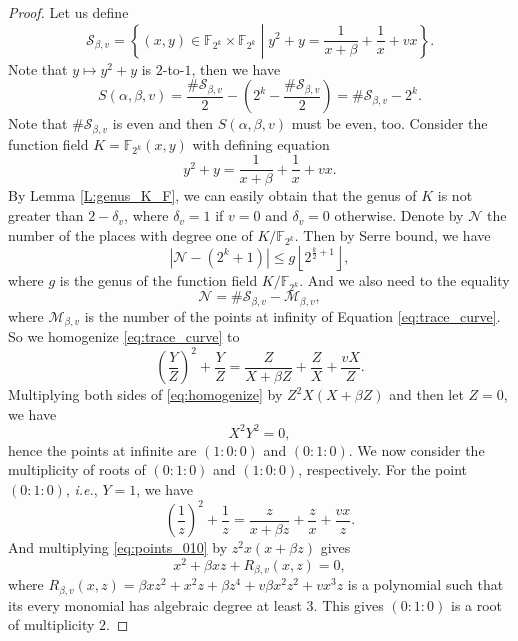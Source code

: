 \documentclass{article}
\newcommand{\F}{\mathbb{F}}
\newcommand{\0}{\textbf{0}}
\newcommand{\1}{\textbf{1}}
\theoremstyle{plain}
\begin{document}
\begin{proof}
        Let us define
        \[\mathcal{S}_{\beta,v}=\left\{(x,y)\in\F_{2^k}\times\F_{2^k}\middle|y^2+y=\frac{1}{x+\beta}+\frac{1}{x}+vx\right\}.\]
        Note that $y\mapsto y^2+y$ is $2$-to-$1$, then we have
        \begin{equation}\label{eq:tracesum_S}
            S(\alpha,\beta,v)=\frac{\#\mathcal{S}_{\beta,v}}{2}-\left(2^k-\frac{\#\mathcal{S}_{\beta,v}}{2}\right)=\#\mathcal{S}_{\beta,v}-2^k.
        \end{equation}
        Note that $\#\mathcal{S}_{\beta,v}$ is even and then $S(\alpha,\beta,v)$ must be even, too.
        Consider the function field $K=\F_{2^k}(x,y)$ with defining equation
        \begin{equation}\label{eq:trace_curve}
            y^2+y=\frac{1}{x+\beta}+\frac{1}{x}+vx.
        \end{equation}
        By Lemma \ref{L:genus_K_F}, we can easily obtain that the genus of $K$ is not greater than $2-\delta_v$,
        where $\delta_v=1$ if $v=0$ and $\delta_v=0$ otherwise.
        Denote by $\mathcal{N}$ the number of the places with degree one of $K/\F_{2^k}$.
        Then by Serre bound\cite{Serre1982serrebound}, we have
        \begin{equation}\label{eq:N_genus_inequality}
            \left\lvert \mathcal{N}-(2^k+1)\right\rvert\le g\left\lfloor 2^{\frac{k}{2}+1}\right\rfloor,
        \end{equation}
        where $g$ is the genus of the function field $K/\F_{2^k}$.
        And we also need to the equality
        \begin{equation}\label{eq:N_S_M_equality}
            \mathcal{N}=\#\mathcal{S}_{\beta,v}-\mathcal{M}_{\beta,v},
        \end{equation}
        where $\mathcal{M}_{\beta,v}$ is the number of the points at infinity of Equation \eqref{eq:trace_curve}.
        So we homogenize \eqref{eq:trace_curve} to
        \begin{equation}\label{eq:homogenize}
            \left( \frac{Y}{Z} \right)^2+\frac{Y}{Z}=\frac{Z}{X+\beta Z}+\frac{Z}{X}+\frac{vX}{Z}.
        \end{equation}
        Multiplying both sides of \eqref{eq:homogenize} by $Z^2X\left( X+\beta Z \right)$ and then let $Z=0$,
        we have
        \[X^2Y^2=0,\]
        hence the points at infinite are $(1:0:0)$ and $(0:1:0)$.
        We now consider the multiplicity of roots of $(0 : 1 : 0)$ and $(1 : 0 : 0)$, respectively.
        For the point $(0 : 1 : 0 )$, \emph{i.e.}, $Y = 1$, we have
        \begin{equation}\label{eq:points_010}
            \left( \frac{1}{z} \right)^2+\frac{1}{z}=\frac{z}{x+\beta z}+\frac{z}{x}+\frac{vx}{z}.
        \end{equation}
        And multiplying \eqref{eq:points_010} by $z^2x(x+\beta z)$ gives
        \[x^2+\beta xz+R_{\beta,v}(x,z)=0,\]
        where $R_{\beta,v}(x,z)=\beta xz^2+x^2z+\beta z^4+v\beta x^2z^2+vx^3z$ is a polynomial
        such that its every monomial has algebraic degree at least $3$.
        This gives $(0 : 1 : 0)$ is a root of multiplicity $2$.


\end{proof}
\end{document}
